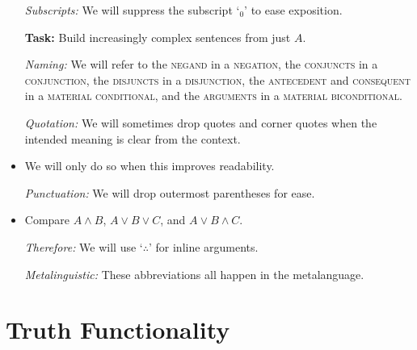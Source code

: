 \documentclass[a4paper, 11pt]{article} %
\begin{document}
\begin{itemize}[leftmargin=1.5in,labelsep=.15in]
\begin{itemize}[leftmargin=1.5in,labelsep=.15in] %
  \item[\it Subscripts:] We will suppress the subscript `$_0$' to ease exposition.
  \item[\bf Task:] Build increasingly complex sentences from just $A$.
  \item[\it Naming:] We will refer to the \textsc{negand} in a \textsc{negation}, the \textsc{conjuncts} in a \textsc{conjunction}, the \textsc{disjuncts} in a \textsc{disjunction}, the \textsc{antecedent} and \textsc{consequent} in a \textsc{material conditional}, and the \textsc{arguments} in a \textsc{material biconditional}.
  \item[\it Quotation:] We will sometimes drop quotes and corner quotes when the intended meaning is clear from the context.
    \item We will only do so when this improves readability.
  \item[\it Punctuation:] We will drop outermost parentheses for ease.
    \item Compare $A\wedge B$, $A\vee B\vee C$, and $A\vee B\wedge C$.
  \item[\it Therefore:] We will use `$\therefore$' for inline arguments.
  \item[\it Metalinguistic:] These abbreviations all happen in the metalanguage.
\end{itemize}






\section*{Truth Functionality}


\end{itemize}
\end{document}
